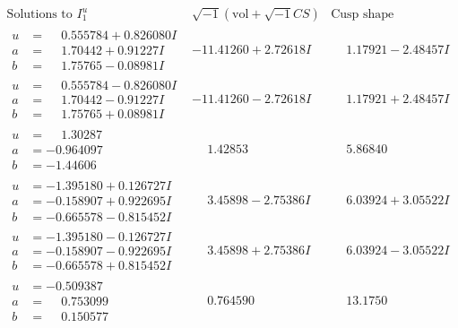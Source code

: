 \documentclass[1p]{elsarticle_modified}
\theoremstyle{definition}
\newcommand{\I}{\sqrt{-1}}
\begin{document}
$$\begin{array}{c|c|c}  
\text{Solutions to }I^u_{1}& \I (\text{vol} + \sqrt{-1}CS) & \text{Cusp shape}\\
 \hline 
\begin{aligned}
u &= \phantom{-}0.555784 + 0.826080 I \\
a &= \phantom{-}1.70442 + 0.91227 I \\
b &= \phantom{-}1.75765 - 0.08981 I\end{aligned}
 & -11.41260 + 2.72618 I & \phantom{-}1.17921 - 2.48457 I \\ \hline\begin{aligned}
u &= \phantom{-}0.555784 - 0.826080 I \\
a &= \phantom{-}1.70442 - 0.91227 I \\
b &= \phantom{-}1.75765 + 0.08981 I\end{aligned}
 & -11.41260 - 2.72618 I & \phantom{-}1.17921 + 2.48457 I \\ \hline\begin{aligned}
u &= \phantom{-}1.30287\phantom{ +0.000000I} \\
a &= -0.964097\phantom{ +0.000000I} \\
b &= -1.44606\phantom{ +0.000000I}\end{aligned}
 & \phantom{-}1.42853\phantom{ +0.000000I} & \phantom{-}5.86840\phantom{ +0.000000I} \\ \hline\begin{aligned}
u &= -1.395180 + 0.126727 I \\
a &= -0.158907 + 0.922695 I \\
b &= -0.665578 - 0.815452 I\end{aligned}
 & \phantom{-}3.45898 - 2.75386 I & \phantom{-}6.03924 + 3.05522 I \\ \hline\begin{aligned}
u &= -1.395180 - 0.126727 I \\
a &= -0.158907 - 0.922695 I \\
b &= -0.665578 + 0.815452 I\end{aligned}
 & \phantom{-}3.45898 + 2.75386 I & \phantom{-}6.03924 - 3.05522 I \\ \hline\begin{aligned}
u &= -0.509387\phantom{ +0.000000I} \\
a &= \phantom{-}0.753099\phantom{ +0.000000I} \\
b &= \phantom{-}0.150577\phantom{ +0.000000I}\end{aligned}
 & \phantom{-}0.764590\phantom{ +0.000000I} & \phantom{-}13.1750\phantom{ +0.000000I} \\ \hline\begin{aligned}

\end{aligned}
\end{array}$$
\end{document}
